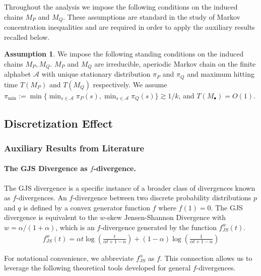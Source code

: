 \documentclass{article}
\theoremstyle{plain}
\theoremstyle{definition}
\newtheorem{assumption}[theorem]{Assumption}
\theoremstyle{remark}
\begin{document}
Throughout the analysis we impose the following conditions on the induced chains
$M_P$ and $M_Q$. These assumptions are standard in the study of Markov
concentration inequalities and are required in order to apply the auxiliary
results recalled below.
\begin{assumption}\label{assumption:markov-chain}
    We impose the following standing conditions on the induced chains $M_P, M_Q$. 
$M_P$ and $ M_Q$ are irreducible, aperiodic Markov chain on the finite alphabet $\mathcal{A}$ with unique stationary distribution $\pi_P$ and $\pi_Q$ and maximum hitting time $T(M_P)$ and $T(M_Q)$ respectively. We assume $\pi_{\min}:=\min \{\min_{s\in \mathcal{A}}\pi_P(s),\min_{s\in \mathcal{A}}\pi_Q(s)\} \gtrsim 1/k $, and $T(M_{\bullet})=O(1)$. 
\end{assumption}
\subsection{Discretization Effect}
\subsubsection{Auxiliary Results from Literature}
\paragraph{The GJS Divergence as $f$-divergence.} The GJS divergence is a specific instance of a broader class of divergences known as $f$-divergences. An $f$-divergence between two discrete probability distributions $p$ and $q$ is defined by a convex generator function $f$ where $f(1)=0$. The GJS divergence is equivalent to the $w$-skew Jensen-Shannon Divergence with $w=\alpha/(1+\alpha)$, which is an $f$-divergence generated by the function $f_{JS}^{w}(t)$.
\begin{align}
 f_{JS}^{w}(t) = \alpha t \log(\frac{t}{\alpha t +1 - \alpha})+(1-\alpha) \log (\frac{1}{\alpha t +1 - \alpha})   
\end{align}


For notational convenience, we abbreviate $f_{JS}^{\alpha}$ as $f$. This connection allows us to leverage the following theoretical tools developed for general $f$-divergences. 
\end{document}
